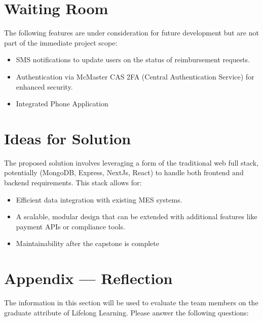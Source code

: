 \documentclass[12pt]{article}
\begin{document}
\section{Waiting Room}
The following features are under consideration for future development but are not part of the immediate project scope:
\begin{itemize}
    \item SMS notifications to update users on the status of reimbursement requests.
    \item Authentication via McMaster CAS 2FA (Central Authentication Service) for enhanced security.
    \item Integrated Phone Application
\end{itemize}

\section{Ideas for Solution}
The proposed solution involves leveraging a form of the traditional web full stack, potentially (MongoDB, Express, NextJs, React) to handle both frontend and backend requirements. This stack allows for:
\begin{itemize}
    \item Efficient data integration with existing MES systems.
    \item A scalable, modular design that can be extended with additional features like payment APIs or compliance tools.
    \item Maintainability after the capstone is complete
\end{itemize}
 


\newpage{}
\section*{Appendix --- Reflection}

The information in this section will be used to evaluate the team members on the
graduate attribute of Lifelong Learning.  Please answer the following questions:
\end{document}
